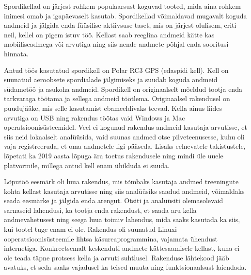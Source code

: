 
Spordikellad on järjest rohkem populaarsust koguvad tooted, mida aina rohkem inimesi omab ja igapäevaselt kasutab.
Spordikellad võimaldavad mugavalt koguda andmeid ja jälgida enda füüsilise aktiivsuse taset, mis on järjest olulisem, eriti neil, kellel on pigem istuv töö.
Kellast saab reeglina andmeid kätte kas mobiiliseadmega või arvutiga ning siis nende andmete põhjal enda sooritusi hinnata.

Antud töös kasutatud spordikell on Polar RC3 GPS (edaspidi kell).
Kell on suunatud aeroobsete spordialade jälgimiseks ja suudab koguda andmeid südametöö ja asukoha andmeid.
Spordikell on originaalselt mõeldud tootja enda tarkvaraga töötama ja sellega andmeid töötlema.
Originaalsel rakendusel on puudujääke, mis selle kasutamist ebameeldivaks teevad.
Kella ainus liides arvutiga on USB ning rakendus töötas vaid Windows ja Mac operatsioonisüsteemidel.
Veel ei kogunud rakendus andmeid kasutaja arvutisse, et siis neid lokaalselt analüüsida, vaid suunas andmed otse pilveteenusesse, kuhu oli vaja registreeruda, et oma andmetele ligi pääseda.
Lisaks eelnevatele takistustele, lõpetati ka 2019 aasta lõpuga\cite{polar-ws-discontinued} ära toetus rakendusele ning mindi üle uuele platvormile, millega antud kell enam ühilduda ei suuda.

Lõputöö eesmärk oli luua rakendus, mis tõmbaks kasutaja andmed treeningute kohta kellast kasutaja arvutisse ning siis analüüsiks saadud andmeid, võimaldaks seada eesmärke ja jälgida enda arengut.
Otsiti ja analüüsiti olemasolevaid sarnaseid lahendusi, ka tootja enda rakendust, et saada aru kella andmevahetusest ning seega luua toimiv lahendus, mida saaks kasutada ka siis, kui tootel tuge enam ei ole.
Rakendus oli suunatud Linuxi ooperatsioonisüsteemile lihtsa käsureaprogrammina, vajamata ühendust internetiga.
Konkreetsemalt keskenduti andmete kättesaamisele kellast, kuna ei ole teada täpne protsess kella ja arvuti suhtlusel.
Rakenduse lähtekood jääb avatuks, et seda saaks vajadusel ka teised muuta ning funktsionaalsust laiendada.

